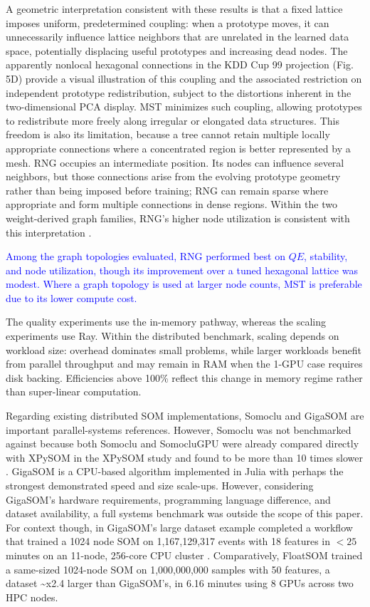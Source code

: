 \documentclass[10pt]{article} %
\newcommand{\TrackedChange}[1]{\textcolor{blue}{#1}}
\begin{document}
A geometric interpretation consistent with these results is that a fixed lattice imposes uniform, predetermined coupling: when a prototype moves, it can unnecessarily influence lattice neighbors that are unrelated in the learned data space, potentially displacing useful prototypes and increasing dead nodes. The apparently nonlocal hexagonal connections in the KDD Cup 99 projection (Fig. 5D) provide a visual illustration of this coupling and the associated restriction on independent prototype redistribution, subject to the distortions inherent in the two-dimensional PCA display. MST minimizes such coupling, allowing prototypes to redistribute more freely along irregular or elongated data structures. This freedom is also its limitation, because a tree cannot retain multiple locally appropriate connections where a concentrated region is better represented by a mesh. RNG occupies an intermediate position. Its nodes can influence several neighbors, but those connections arise from the evolving prototype geometry rather than being imposed before training; RNG can remain sparse where appropriate and form multiple connections in dense regions. Within the two weight-derived graph families, RNG's higher node utilization is consistent with this interpretation \citep{kohonenEssentialsSelforganizingMap2013,kangasVariantsSelforganizingMaps1990,toussaintRelativeNeighbourhoodGraph1980}.

\TrackedChange{Among the graph topologies evaluated, RNG performed best on $QE$, stability, and node utilization, though its improvement over a tuned hexagonal lattice was modest. Where a graph topology is used at larger node counts, MST is preferable due to its lower compute cost.}

The quality experiments use the in-memory pathway, whereas the scaling experiments use Ray. Within the distributed benchmark, scaling depends on workload size: overhead dominates small problems, while larger workloads benefit from parallel throughput and may remain in RAM when the 1-GPU case requires disk backing. Efficiencies above 100\% reflect this change in memory regime rather than super-linear computation.

Regarding existing distributed SOM implementations, Somoclu and GigaSOM are important parallel-systems references. However, Somoclu was not benchmarked against because both Somoclu and SomocluGPU were already compared directly with XPySOM in the XPySOM study and found to be more than 10 times slower \citep{manciniXPySomHighPerformanceSelfOrganizing2020}. GigaSOM is a CPU-based algorithm implemented in Julia with perhaps the strongest demonstrated speed and size scale-ups. However, considering GigaSOM's hardware requirements, programming language difference, and dataset availability, a full systems benchmark was outside the scope of this paper. For context though, in GigaSOM's large dataset example completed a workflow that trained a 1024 node SOM on 1,167,129,317 events with 18 features in $<25$ minutes on an 11-node, 256-core CPU cluster \citep{kratochvilGigaSOMjlHighperformanceClustering2020}. Comparatively, FloatSOM trained a same-sized 1024-node SOM on 1,000,000,000 samples with 50 features, a dataset \textasciitilde{}x2.4 larger than GigaSOM's, in 6.16 minutes using 8 GPUs across two HPC nodes.
\end{document}
